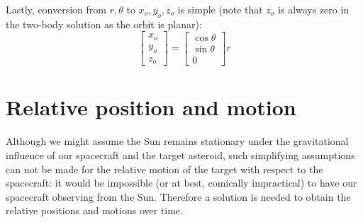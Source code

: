 \documentclass[a4paper,10pt]{article}
\begin{document}
Lastly, conversion from $r, \theta$ to $x_o, y_o, z_o$ is simple (note that $z_o$ is always zero in the two-body solution as the orbit is planar):
\begin{equation}
 \begin{bmatrix}
  x_o \\ y_o \\ z_o
 \end{bmatrix}
 =
 \begin{bmatrix}
  \cos \theta \\ \sin \theta \\ 0
 \end{bmatrix}
 r
\end{equation}

\section{Relative position and motion}

Although we might assume the Sun remains stationary under the gravitational influence of our spacecraft and the target asteroid, such simplifying assumptions can not be made for the relative motion of the target with respect to the spacecraft: it would be impossible (or at best, comically impractical) to have our spacecraft observing from the Sun. Therefore a solution is needed to obtain the relative positions and motions over time.\\
\end{document}
